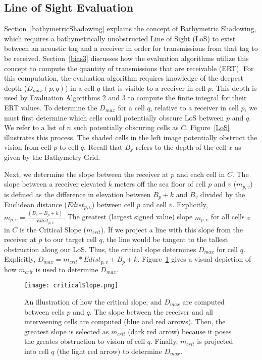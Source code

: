 \subsection {Line of Sight Evaluation}
\label{LoSAlgorithm}
Section~\ref{bathymetricShadowing} explains the concept of Bathymetric Shadowing, which requires a bathymetrically unobstructed Line of Sight (LoS) to exist between an acoustic tag and a receiver in order for transmissions from that tag to be received.  Section~\ref{bias3} discusses how the evaluation algorithms utilize this concept to compute the quantity of transmissions that are receivable (ERT).  For this computation, the evaluation algorithm requires knowledge of the deepest depth ($D_{max}(p,q)$) in a cell $q$ that is visible to a receiver in cell $p$.  This depth is used by Evaluation Algorithms 2 and 3 to compute the finite integral for their ERT values.
To determine the $D_{max}$ for a cell $q$, relative to a receiver in cell $p$, we must first determine which cells could potentially obscure LoS between $p$ and $q$.  We refer to a list of $n$ such potentially obscuring cells as $C$.   Figure~\ref{LoS} illustrates this process.  The shaded cells in the left image potentially obstruct the vision from cell $p$ to cell $q$.  Recall that $B_x$ refers to the depth of the cell $x$ as given by the Bathymetry Grid.

Next, we determine the slope between the receiver at $p$ and each cell in $C$.  The slope between a receiver elevated $k$ meters off the sea floor of cell $p$ and $v$  ($m_{p,v}$) is defined as the difference in elevation between $B_p + k$ and $B_v$ divided by the Euclidean distance ($Edist_{p,v}$) between cell $p$ and cell $v$.  Explicitly, $m_{p,v} = \frac{(B_v - B_p + k)}{Edist_{p,v}}$.  The greatest (largest signed value) slope $m_{p,v}$ for all cells $v$ in $C$ is the Critical Slope ($m_{crit}$).  If we project a line with this slope from the receiver at $p$ to our target cell $q$, the line would be tangent to the tallest obstruction along our LoS.  Thus, the critical slope determines $D_{max}$ for cell $q$.  Explicitly, $D_{max} = m_{crit} * Edist_{p,v} + B_p + k$.  Figure~\ref{LoSimage} gives a visual depiction of how $m_{crit}$ is used to determine $D_{max}$.

\begin{figure}[ht]
	\centering
	\texttt{[image: criticalSlope.png]}
	\caption{An illustration of how the critical slope, and $D_{max}$ are computed between cells $p$ and $q$.  The slope between the receiver and all interveening cells are computed (blue and red arrows).  Then, the greatest slope is selected as $m_{crit}$ (dark red arrow) because it poses the greates obstruction to vision of cell $q$.  Finally, $m_{crit}$ is projected into cell $q$ (the light red arrow) to determine $D_{max}$.
		\label{LoSimage}}
\end{figure}


